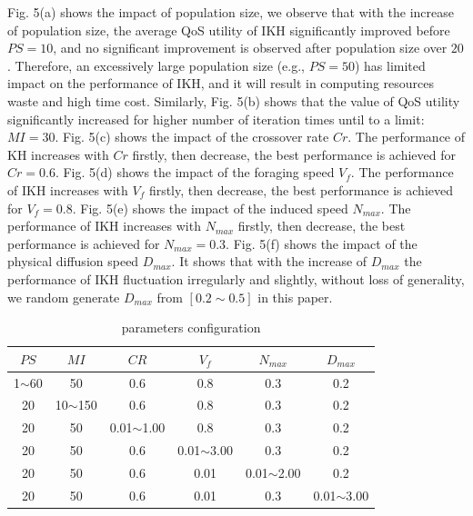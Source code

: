 \documentclass[10pt,journal,compsoc]{IEEEtran}
\begin{document}
Fig. 5(a) shows the impact of population size, we observe that with the increase of population size, the average QoS utility of IKH significantly improved before $PS=10$, and no significant improvement is observed after population size over $20$. Therefore, an excessively large population size (e.g., $PS=50$) has limited impact on the performance of IKH, and it will result in computing resources waste and high time cost.
Similarly, Fig. 5(b) shows that the value of QoS utility significantly increased for higher number of iteration times until to a limit: $MI = 30$. 
Fig. 5(c) shows the impact of the crossover rate $Cr$. The performance of KH increases with $Cr$ firstly, then decrease, the best performance is achieved for $Cr = 0.6$.
Fig. 5(d) shows the impact of the foraging speed $V_f$. The performance of IKH increases with $V_f$ firstly, then decrease, the best performance is achieved for $V_f = 0.8$.
Fig. 5(e) shows the impact of the induced speed $N_{max}$. The performance of IKH increases with $N_{max}$ firstly, then decrease, the best performance is achieved for $N_{max} = 0.3$.
Fig. 5(f) shows the impact of the physical diffusion speed $D_{max}$. It shows that with the increase of $D_{max}$ the performance of IKH fluctuation irregularly and slightly, without loss of generality, we random generate $D_{max}$ from $[0.2 \sim 0.5]$ in this paper.

\begin{table}[!t]
\renewcommand{\arraystretch}{1.3}
\caption{parameters configuration}
\label{table_example}
\centering
\begin{tabular}{cccccc}
\hline
\bfseries $PS$ & \bfseries $MI$ & \bfseries $CR$ & \bfseries $V_f$ & \bfseries $N_{max}$ & \bfseries $D_{max}$ \\
\hline
1$\sim$60 & 50          & 0.6            & 0.8            &  0.3            &  0.2 \\
20        & 10$\sim$150 & 0.6            & 0.8            &  0.3            &  0.2 \\
20        & 50          & 0.01$\sim$1.00 & 0.8            &  0.3            &  0.2 \\
20        & 50          & 0.6            & 0.01$\sim$3.00 &  0.3            &  0.2 \\
20        & 50          & 0.6            & 0.01           &  0.01$\sim$2.00 &  0.2 \\
20        & 50          & 0.6            & 0.01           &  0.3            &  0.01$\sim$3.00 \\
\hline
\end{tabular}
\end{table}
\end{document}
